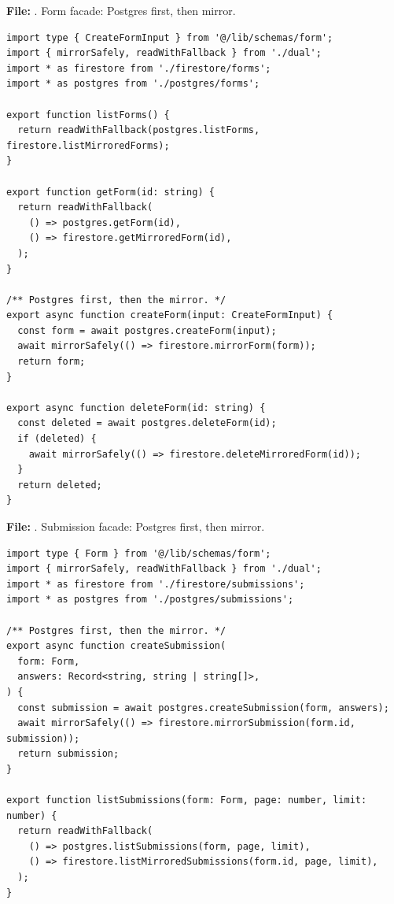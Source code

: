 \documentclass[11pt,a4paper]{article}
\begin{document}
\textbf{File:} . Form facade: Postgres first, then mirror.\par
\begin{lstlisting}
import type { CreateFormInput } from '@/lib/schemas/form';
import { mirrorSafely, readWithFallback } from './dual';
import * as firestore from './firestore/forms';
import * as postgres from './postgres/forms';

export function listForms() {
  return readWithFallback(postgres.listForms, firestore.listMirroredForms);
}

export function getForm(id: string) {
  return readWithFallback(
    () => postgres.getForm(id),
    () => firestore.getMirroredForm(id),
  );
}

/** Postgres first, then the mirror. */
export async function createForm(input: CreateFormInput) {
  const form = await postgres.createForm(input);
  await mirrorSafely(() => firestore.mirrorForm(form));
  return form;
}

export async function deleteForm(id: string) {
  const deleted = await postgres.deleteForm(id);
  if (deleted) {
    await mirrorSafely(() => firestore.deleteMirroredForm(id));
  }
  return deleted;
}
\end{lstlisting}

\textbf{File:} . Submission facade: Postgres first, then mirror.\par
\begin{lstlisting}
import type { Form } from '@/lib/schemas/form';
import { mirrorSafely, readWithFallback } from './dual';
import * as firestore from './firestore/submissions';
import * as postgres from './postgres/submissions';

/** Postgres first, then the mirror. */
export async function createSubmission(
  form: Form,
  answers: Record<string, string | string[]>,
) {
  const submission = await postgres.createSubmission(form, answers);
  await mirrorSafely(() => firestore.mirrorSubmission(form.id, submission));
  return submission;
}

export function listSubmissions(form: Form, page: number, limit: number) {
  return readWithFallback(
    () => postgres.listSubmissions(form, page, limit),
    () => firestore.listMirroredSubmissions(form.id, page, limit),
  );
}
\end{lstlisting}
\end{document}
